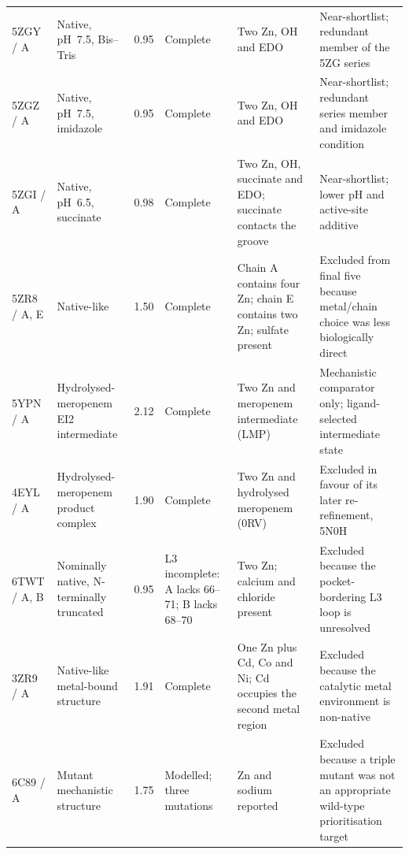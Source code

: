 \begin{table}[htbp]
\begin{tabularx}{\textwidth}{@{}llclXX@{}}
    5ZGY / A & Native, pH~7.5, Bis--Tris & 0.95 & Complete
      & Two Zn, OH and EDO
      & Near-shortlist; redundant member of the 5ZG series \\
    5ZGZ / A & Native, pH~7.5, imidazole & 0.95 & Complete
      & Two Zn, OH and EDO
      & Near-shortlist; redundant series member and imidazole condition \\
    5ZGI / A & Native, pH~6.5, succinate & 0.98 & Complete
      & Two Zn, OH, succinate and EDO; succinate contacts the groove
      & Near-shortlist; lower pH and active-site additive \\
    5ZR8 / A, E & Native-like & 1.50 & Complete
      & Chain A contains four Zn; chain E contains two Zn; sulfate present
      & Excluded from final five because metal/chain choice was less
        biologically direct \\
    5YPN / A & Hydrolysed-meropenem EI2 intermediate & 2.12 & Complete
      & Two Zn and meropenem intermediate (LMP)
      & Mechanistic comparator only; ligand-selected intermediate state \\
    4EYL / A & Hydrolysed-meropenem product complex & 1.90 & Complete
      & Two Zn and hydrolysed meropenem (0RV)
      & Excluded in favour of its later re-refinement, 5N0H \\
    6TWT / A, B & Nominally native, N-terminally truncated & 0.95
      & L3 incomplete: A lacks 66--71; B lacks 68--70
      & Two Zn; calcium and chloride present
      & Excluded because the pocket-bordering L3 loop is unresolved \\
    3ZR9 / A & Native-like metal-bound structure & 1.91 & Complete
      & One Zn plus Cd, Co and Ni; Cd occupies the second metal region
      & Excluded because the catalytic metal environment is non-native \\
    6C89 / A & Mutant mechanistic structure & 1.75 & Modelled; three mutations
      & Zn and sodium reported
      & Excluded because a triple mutant was not an appropriate wild-type
        prioritisation target \\
    \bottomrule
  \end{tabularx}
\end{table}


